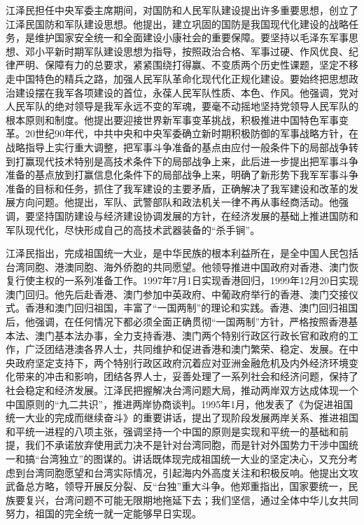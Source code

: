 \documentclass[UTF8, 11pt, oneside]{ctexart}
\begin{document}
江泽民担任中央军委主席期间，对国防和人民军队建设提出许多重要思想，创立了江泽民国防和军队建设思想。他提出，建立巩固的国防是我国现代化建设的战略任务，是维护国家安全统一和全面建设小康社会的重要保障。要坚持以毛泽东军事思想、邓小平新时期军队建设思想为指导，按照政治合格、军事过硬、作风优良、纪律严明、保障有力的总要求，紧紧围绕打得赢、不变质两个历史性课题，坚定不移走中国特色的精兵之路，加强人民军队革命化现代化正规化建设。要始终把思想政治建设摆在我军各项建设的首位，永葆人民军队性质、本色、作风。他强调，党对人民军队的绝对领导是我军永远不变的军魂，要毫不动摇地坚持党领导人民军队的根本原则和制度。他提出要迎接世界新军事变革挑战，积极推进中国特色军事变革。20世纪90年代，中共中央和中央军委确立新时期积极防御的军事战略方针，在战略指导上实行重大调整，把军事斗争准备的基点由应付一般条件下的局部战争转到打赢现代技术特别是高技术条件下的局部战争上来，此后进一步提出把军事斗争准备的基点放到打赢信息化条件下的局部战争上来，明确了新形势下我军军事斗争准备的目标和任务，抓住了我军建设的主要矛盾，正确解决了我军建设和改革的发展方向问题。他提出，军队、武警部队和政法机关一律不再从事经商活动。他强调，要坚持国防建设与经济建设协调发展的方针，在经济发展的基础上推进国防和军队现代化，尽快形成自己的高技术武器装备的“杀手锏”。

江泽民指出，完成祖国统一大业，是中华民族的根本利益所在，是全中国人民包括台湾同胞、港澳同胞、海外侨胞的共同愿望。他领导推进中国政府对香港、澳门恢复行使主权的一系列准备工作。1997年7月1日实现香港回归，1999年12月20日实现澳门回归。他先后赴香港、澳门参加中英政府、中葡政府举行的香港、澳门交接仪式。香港和澳门回归祖国，丰富了“一国两制”的理论和实践。香港、澳门回归祖国后，他强调，在任何情况下都必须全面正确贯彻“一国两制”方针，严格按照香港基本法、澳门基本法办事，全力支持香港、澳门两个特别行政区行政长官和政府的工作，广泛团结港澳各界人士，共同维护和促进香港和澳门繁荣、稳定、发展。在中央政府坚定支持下，两个特别行政区政府沉着应对亚洲金融危机及内外经济环境变化带来的冲击和影响，团结各界人士，妥善处理了一系列社会和经济问题，保持了社会稳定和经济发展。江泽民把握解决台湾问题大局，推动两岸双方达成体现一个中国原则的“九二共识”，推进两岸协商谈判。1995年1月，他发表了《为促进祖国统一大业的完成而继续奋斗》的重要讲话，提出了现阶段发展两岸关系、推进祖国和平统一进程的八项主张，强调坚持一个中国的原则是实现和平统一的基础和前提，我们不承诺放弃使用武力决不是针对台湾同胞，而是针对外国势力干涉中国统一和搞“台湾独立”的图谋的。讲话既体现完成祖国统一大业的坚定决心，又充分考虑到台湾同胞愿望和台湾实际情况，引起海内外高度关注和积极反响。他提出文攻武备总方略，领导开展反分裂、反“台独”重大斗争。他郑重指出，国家要统一，民族要复兴，台湾问题不可能无限期地拖延下去；我们坚信，通过全体中华儿女共同努力，祖国的完全统一就一定能够早日实现。
\end{document}
